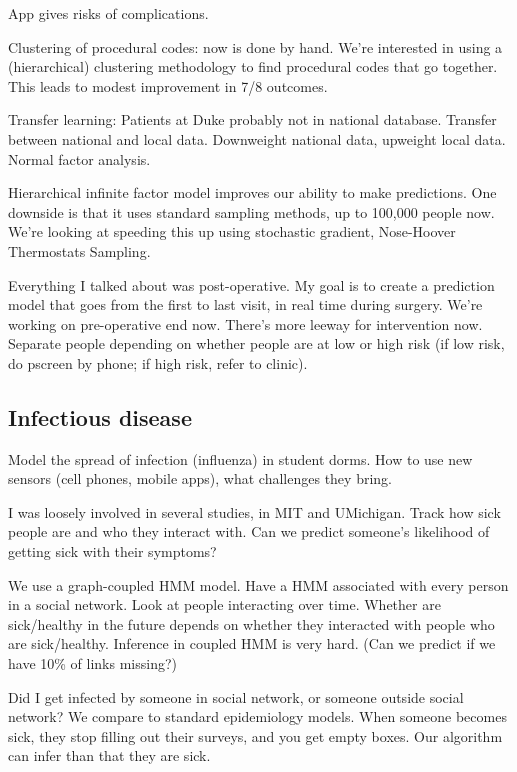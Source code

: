 App gives risks of complications.

Clustering of procedural codes: now is done by hand. We're interested in using a (hierarchical) clustering methodology to find procedural codes that go together.
This leads to modest improvement in 7/8 outcomes.

Transfer learning: Patients at Duke probably not in national database. Transfer between national and local data. Downweight national data, upweight local data. Normal factor analysis. 

Hierarchical infinite factor model improves our ability to make predictions. One downside is that it uses standard sampling methods, up to 100,000 people now. We're looking at speeding this up using stochastic gradient, Nose-Hoover Thermostats Sampling.

Everything I talked about was post-operative. My goal is to create a prediction model that goes from the first to last visit, in real time during surgery. We're working on pre-operative end now. There's more leeway for intervention now. Separate people depending on whether people are at low or high risk (if low risk, do pscreen by phone; if high risk, refer to clinic).

\subsection{Infectious disease}
Model the spread of infection (influenza) in student dorms.
How to use new sensors (cell phones, mobile apps), what challenges they bring.

I was loosely involved in several studies, in MIT and UMichigan. Track how sick people are and who they interact with. Can we predict someone's likelihood of getting sick with their symptoms?

We use a graph-coupled HMM model. Have a HMM associated with every person in a social network. Look at people interacting over time. Whether are sick/healthy in the future depends on whether they interacted with people who are sick/healthy. 
Inference in coupled HMM is very hard. 
(Can we predict if we have 10\% of links missing?)

Did I get infected by someone in social network, or someone outside social network? We compare to standard epidemiology models. 
When someone becomes sick, they stop filling out their surveys, and you get empty boxes. Our algorithm can infer than that they are sick.

